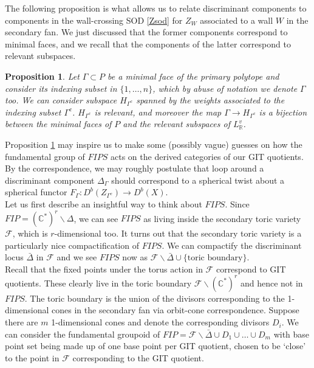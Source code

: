 \documentclass[oneside]{amsart}
\newtheorem{prop}{Proposition} [section]
\theoremstyle{definition}
\theoremstyle{definition}
\theoremstyle{definition}
\theoremstyle{definition}
\newcommand{\CC}{\mathbb{C}}
\newcommand{\Fs}{\mathcal{F}}
\begin{document}
The following proposition is what allows us to relate discriminant components to components in the wall-crossing SOD \eqref{Zsod} for $Z_W$ associated to a wall $W$ in the secondary fan. We just discussed that the former components correspond to minimal faces, and we recall that the components of the latter correspond to relevant subspaces.
\begin{prop}
    \label{faces&subspaces}
    Let $\Gamma \subset P$ be a minimal face of the primary polytope and consider its indexing subset in $\{1,\dots,n \}$, which by abuse of notation we denote $\Gamma$ too. We can consider subspace $H_{\Gamma^c}$ spanned by the weights associated to the indexing subset $\Gamma^c$. $H_{\Gamma^c}$ is relevant, and moreover the map $\Gamma \to H_{\Gamma^c}$ is a bijection between the minimal faces of $P$ and the relevant subspaces of $L_{\mathbb{R}}^v$.
\end{prop}
\noindent
Proposition \ref{faces&subspaces} may inspire us to make some (possibly vague) guesses on how the fundamental group of $FIPS$ acts on the derived categories of our GIT quotients. By the correspondence, we may roughly postulate that loop around a discriminant component $\Delta_\Gamma$ should correspond to a spherical twist about a spherical functor $F_{\Gamma} : D^b(Z_{\Gamma^c}) \to D^b(X)$. \\
\newline
Let us first describe an insightful way to think about $FIPS$. Since $FIP=(\CC^*)^r \backslash \Delta $, we can see $FIPS$ as living inside the secondary toric variety $\Fs$, which is $r$-dimensional too. It turns out that the secondary toric variety is a particularly nice compactification of $FIPS$. We can compactify the discriminant locus $\bar{\Delta} $ in $\Fs$ and we see $FIPS$ now as $\Fs \backslash \bar{\Delta} \cup \{\text{toric boundary} \}$. \\
\newline
Recall that the fixed points under the torus action in $\Fs$ correspond to GIT quotients. These clearly live in the toric boundary $\Fs \backslash (\CC^*)^r$ and hence not in $FIPS$. The toric boundary is the union of the divisors corresponding to the 1-dimensional cones in the secondary fan via orbit-cone correspondence. Suppose there are $m$ 1-dimensional cones and denote the corresponding divisors $D_i$. We can consider the fundamental groupoid of $FIP= \Fs \backslash \bar{\Delta} \cup D_1 \cup \dots \cup D_m$ with base point set being made up of one base point per GIT quotient, chosen to be `close' to the point in $\Fs$ corresponding to the GIT quotient. 
\end{document}
